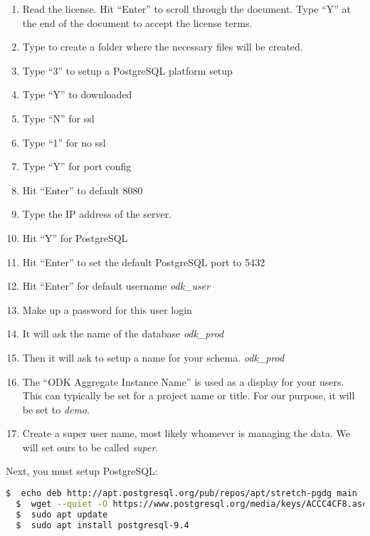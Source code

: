 \begin{enumerate}


\item Read the license. Hit ``Enter'' to scroll through the document. Type ``Y'' at the end of the document to accept the license terms.

\item Type  to create a folder where the necessary files will be created.


\item  Type ``3'' to setup a PostgreSQL platform setup

\item Type ``Y'' to downloaded
\item Type ``N'' for ssl
\item Type ``1'' for no ssl
\item Type ``Y'' for port config
\item Hit ``Enter'' to default 8080
\item Type the IP address of the server.
\item Hit ``Y'' for PostgreSQL
\item Hit ``Enter'' to set the default PostgreSQL port to 5432
\item Hit ``Enter'' for default username \emph{odk\_user}
\item Make up a password for this user login
\item It will ask the name of the database \emph{odk\_prod}
\item Then it will ask to setup a name for your schema. \emph{odk\_prod}

\item The ``ODK Aggregate Instance Name'' is used as a display for your users. This can typically be set for a project name or title. For our purpose, it will be set to
\emph{demo}.
\item Create a super user name, most likely whomever is managing the data. We will set ours to be called \emph{super}.

\end{enumerate}

\noindent
Next, you must setup PostgreSQL:
\begin{lstlisting}[language=bash]
  $  echo deb http://apt.postgresql.org/pub/repos/apt/stretch-pgdg main | sudo tee -a /etc/apt/sources.list
  $  wget --quiet -O https://www.postgresql.org/media/keys/ACCC4CF8.asc | sudo apt-key add -
  $  sudo apt update
  $  sudo apt install postgresql-9.4
\end{lstlisting}

